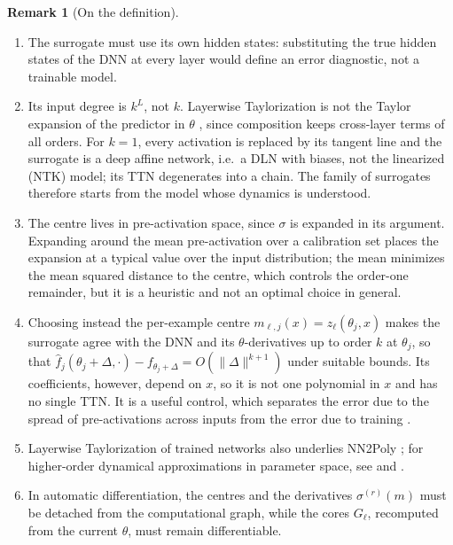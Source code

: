 \documentclass[11pt]{article}
\newcommand{\norm}[1]{\lVert #1\rVert}
\newcommand{\fhat}{\hat f}
\theoremstyle{definition}
\newtheorem{remark}[theorem]{Remark}
\numberwithin{equation}{section}
\begin{document}
\begin{remark}[On the definition]\label{rem:surrogate-def}
\leavevmode
\begin{enumerate}[label=(\roman*),nosep]
\item The surrogate must use its own hidden states: substituting the true hidden states of the DNN at every layer would define an error diagnostic, not a trainable model.
\item Its input degree is $k^L$, not $k$. Layerwise Taylorization is not the Taylor expansion of the predictor in $\theta$ \citep{bai2020taylorized}, since composition keeps cross-layer terms of all orders. For $k=1$, every activation is replaced by its tangent line and the surrogate is a deep affine network, i.e.\ a DLN with biases, not the linearized (NTK) model; its TTN degenerates into a chain. The family of surrogates therefore starts from the model whose dynamics is understood.
\item The centre lives in pre-activation space, since $\sigma$ is expanded in its argument. Expanding around the mean pre-activation over a calibration set places the expansion at a typical value over the input distribution; the mean minimizes the mean squared distance to the centre, which controls the order-one remainder, but it is a heuristic and not an optimal choice in general.
\item Choosing instead the per-example centre $m_{\ell,j}(x)=z_\ell(\theta_j,x)$ makes the surrogate agree with the DNN and its $\theta$-derivatives up to order $k$ at $\theta_j$, so that $\fhat_j(\theta_j+\Delta,\cdot)-f_{\theta_j+\Delta}=O(\norm\Delta^{k+1})$ under suitable bounds. Its coefficients, however, depend on $x$, so it is not one polynomial in $x$ and has no single TTN. It is a useful control, which separates the error due to the spread of pre-activations across inputs from the error due to training \citep[Section~2.3]{hfl_local}.
\item Layerwise Taylorization of trained networks also underlies NN2Poly \citep{morala2025nn2poly}; for higher-order dynamical approximations in parameter space, see \citet{bai2020taylorized} and \citet{huang2020dynamics}.
\item In automatic differentiation, the centres and the derivatives $\sigma^{(r)}(m)$ must be detached from the computational graph, while the cores $G_\ell$, recomputed from the current $\theta$, must remain differentiable.
\end{enumerate}
\end{remark}
\end{document}
